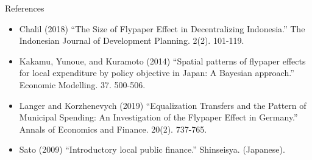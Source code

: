 \documentclass[
  ignorenonframetext,
]{beamer}
\providecommand{\tightlist}{%
  \setlength{\itemsep}{0pt}\setlength{\parskip}{0pt}}
\begin{document}
\begin{frame}{References}
\protect\hypertarget{references}{}

\begin{itemize}
\tightlist
\item
  Chalil (2018) ``The Size of Flypaper Effect in Decentralizing
  Indonesia.'' The Indonesian Journal of Development Planning. 2(2).
  101-119.
\item
  Kakamu, Yunoue, and Kuramoto (2014) ``Spatial patterns of flypaper
  effects for local expenditure by policy objective in Japan: A Bayesian
  approach.'' Economic Modelling. 37. 500-506.
\item
  Langer and Korzhenevych (2019) ``Equalization Transfers and the
  Pattern of Municipal Spending: An Investigation of the Flypaper Effect
  in Germany.'' Annals of Economics and Finance. 20(2). 737-765.
\item
  Sato (2009) ``Introductory local public finance.'' Shinseisya.
  (Japanese).
\end{itemize}

\end{frame}
\end{document}
